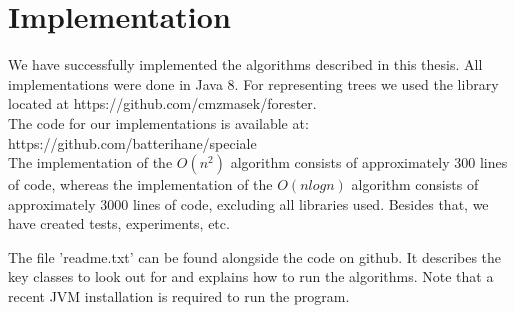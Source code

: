 \chapter{Implementation}
We have successfully implemented the algorithms described in this thesis. All implementations were done in Java 8. For representing trees we used the library located at  https://github.com/cmzmasek/forester. \\

\noindent The code for our implementations is available at: \\
https://github.com/batterihane/speciale \\

\noindent The implementation of the $O(n^2)$ algorithm consists of approximately 300 lines of code, whereas the implementation of the $O(nlogn)$ algorithm consists of approximately 3000 lines of code, excluding all libraries used. Besides that, we have created tests, experiments, etc.

The file 'readme.txt' can be found alongside the code on github. It describes the key classes to look out for and explains how to run the algorithms. Note that a recent JVM installation is required to run the program.
